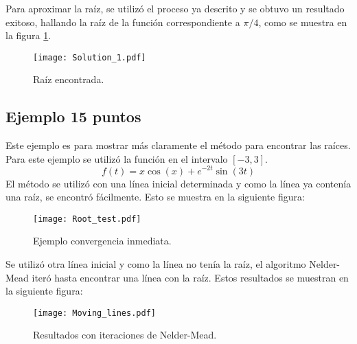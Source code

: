 Para aproximar la raíz, se utilizó el proceso ya descrito y se obtuvo un resultado exitoso, hallando la raíz de la función correspondiente a $\pi/4$, como se muestra en la figura \ref{fig:root1}.
\begin{figure}[H]
    \centering
    \texttt{[image: Solution\_1.pdf]}
    \caption{Raíz encontrada.}
    \label{fig:root1}
\end{figure}

\subsection{Ejemplo 15 puntos}
Este ejemplo es para mostrar más claramente el método para encontrar las raíces. Para este ejemplo se utilizó la función en el intervalo $[-3,3]$.
\begin{equation}
    f(t)=x\cos(x)+e^{-2t}\sin(3t)
\end{equation}
El método se utilizó con una línea inicial determinada y como la línea ya contenía una raíz, se encontró fácilmente. Esto se muestra en la siguiente figura:
\begin{figure}[H]
    \centering
    \texttt{[image: Root\_test.pdf]}
    \caption{Ejemplo convergencia inmediata.}
\end{figure}

Se utilizó otra línea inicial y como la línea no tenía la raíz, el algoritmo Nelder-Mead iteró hasta encontrar una línea con la raíz. Estos resultados se muestran en la siguiente figura:
\begin{figure}[H]
    \centering
    \texttt{[image: Moving\_lines.pdf]}
    \caption{Resultados con iteraciones de Nelder-Mead.}
\end{figure}